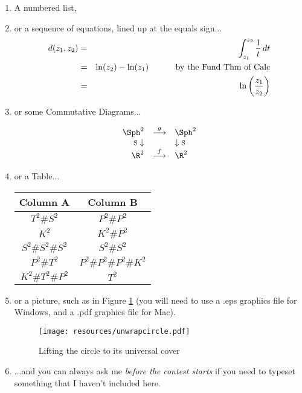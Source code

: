 \documentclass[12pt]{article}   %
\begin{document}
\begin{enumerate}
\item A numbered list,

\item or a sequence of equations, lined up at the equals sign...
\begin{eqnarray*}   %
d(z_1,z_2) & = & \int_{z_1}^{z_2} \frac{1}{t} \, dt \\
& = & \ln(z_2) - \ln(z_1) \mbox{\hspace{1cm} by the Fund Thm of Calc}\\
& = & \ln\left(\frac{z_1}{z_2}\right) \\ %
\end{eqnarray*}

\item or some Commutative Diagrams...

$$\begin{array}{rcl}
\Sph^2  & \stackrel{g}{\longrightarrow} & \Sph^2 \\
\mbox{\footnotesize{S}} \downarrow & & \downarrow \mbox{\footnotesize{S}} \\
\R^2 & \stackrel{f}{\longrightarrow} & \R^2 \\
\end{array}$$

\item or a Table...

\begin{center}
\begin{tabular}{|c|c|}
\hline 
Column A & Column B \\ 
\hline
$T^2 \# S^2$ & $P^2 \# P^2$ \\
$K^2$ & $K^2 \# P^2$ \\
$S^2 \# S^2 \# S^2$ & $S^2 \# S^2$ \\
$P^2 \# T^2$ & $P^2 \# P^2 \# P^2 \# K^2$ \\
$K^2 \# T^2 \# P^2$ & $T^2$ \\
\hline
\end{tabular}
\end{center}

\item or a picture, such as in Figure \ref{fig:fun} (you will need to use a .eps graphics file for Windows, and a .pdf graphics
file for Mac).

\begin{figure}[h]
\centerline{\hspace{-1cm}
    \texttt{[image: resources/unwrapcircle.pdf]}} 
    \caption{Lifting the circle to its universal cover}
\label{fig:fun}
\end{figure}


\item  ...and you can always ask me {\it before the contest starts} if you need to typeset something that I haven't
included here.
\end{enumerate}
\end{document}
